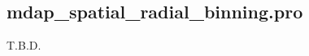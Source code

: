 \subsection{mdap\_spatial\_radial\_binning.pro}
\label{dap_Sec:mdap_spatial_radial_binning}

T.B.D.

